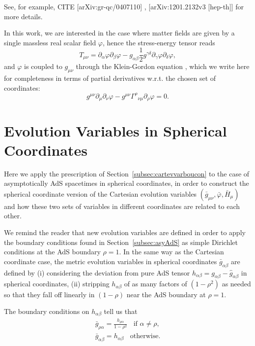 \documentclass[12pt]{iopart} %
\begin{document}
See, for example, CITE [arXiv:gr-qc/0407110] , [arXiv:1201.2132v3 [hep-th]]  for more details.

In this work, we are interested in the case where matter fields are given by a single massless real scalar field $\varphi$, hence the stress-energy tensor reads
\begin{equation}
T_{\mu\nu}=\partial_\alpha \varphi \partial_\beta \varphi - g_{\alpha\beta} \frac{1}{2} g^{\gamma\delta} \partial_{\gamma} \varphi \partial_{\delta} \varphi,
\end{equation}
and $\varphi$ is coupled to $g_{\mu\nu}$ through the Klein-Gordon equation , which we write here for completeness in terms of partial derivatives w.r.t. the chosen set of coordinates:
\begin{equation}\label{eqn:eoms2cart}
g^{\mu\nu} \partial_{\mu} \partial_{\nu} \varphi -g^{\mu\nu} \Gamma^{\rho}{}_{\nu\mu}\partial_\rho\varphi= 0.
\end{equation}

\section{Evolution Variables in Spherical Coordinates}\label{sec:sphevvarboucon}

Here we apply the prescription of Section~\ref{subsec:cartevvarboucon} to the case of asymptotically AdS spacetimes in spherical coordinates, in order to construct the spherical coordinate version of the Cartesian evolution variables $(\bar{g}_{\mu\nu},\bar{\varphi},\bar{H}_\mu)$ and how these two sets of variables in different coordinates are related to each other.

We remind the reader that new evolution variables are defined in order to apply the boundary conditions found in Section~\ref{subsec:asyAdS} as simple Dirichlet conditions at the AdS boundary $\rho=1$. In the same way as the Cartesian coordinate case, the metric evolution variables in spherical coordinates $\bar{g}_{\alpha\beta}$ are defined by (i) considering the deviation from pure AdS tensor $h_{\alpha\beta}=g_{\alpha\beta}-\hat{g}_{\alpha\beta}$ in spherical coordinates, (ii) stripping $h_{\alpha\beta}$ of as many factors of $(1-\rho^2)$ as needed so that they fall off linearly in $(1-\rho)$ near the AdS boundary at $\rho=1$.

The boundary conditions on $h_{\alpha\beta}$  tell us that
\begin{eqnarray}\label{eq:gbarsph}
\bar{g}_{\rho\alpha}=\frac{h_{\rho\alpha} }{1-\rho^2}\;\; \textrm{ if $\alpha\neq\rho$}, \\ \nonumber
\bar{g}_{\alpha\beta}=h_{\alpha\beta}  \;\; \textrm{ otherwise}.
\end{eqnarray}
\end{document}
